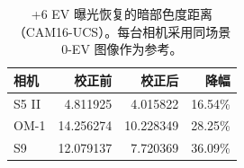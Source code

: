 \begin{table}[!t]
\centering
\caption{+6 EV 曝光恢复的暗部色度距离（CAM16-UCS）。每台相机采用同场景 0-EV 图像作为参考。}\label{tab:color}
\footnotesize
\setlength{\tabcolsep}{4pt}
\begin{tabular}{lrrr}
\toprule
相机 & 校正前 & 校正后 & 降幅 \\
\midrule
S5 II & 4.811925 & 4.015822 & 16.54\% \\
OM-1 & 14.256274 & 10.228349 & 28.25\% \\
S9 & 12.079137 & 7.720369 & 36.09\% \\
\bottomrule
\end{tabular}
\end{table}
